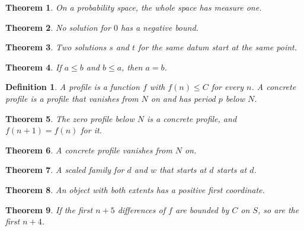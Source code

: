 \documentclass[11pt]{article}
\newtheorem{theorem}{Theorem}
\newtheorem{definition}{Definition}
\newcommand{\lean}[1]{}
\begin{document}
\begin{theorem}\label{thm:probability}\lean{Shape.probability}
On a probability space, the whole space has measure one.
\end{theorem}

\begin{theorem}\label{thm:none-large}\lean{Shape.none_large}
No solution for $0$ has a negative bound.
\end{theorem}

\begin{theorem}\label{thm:two-solutions}\lean{Shape.two_solutions}
Two solutions $s$ and $t$ for the same datum start at the same point.
\end{theorem}

\begin{theorem}\label{thm:both}\lean{Shape.both}
If $a \le b$ and $b \le a$, then $a = b$.
\end{theorem}

\begin{definition}\label{def:profile}\lean{Shape.Profile}\lean{Shape.Concrete}
A profile is a function $f$ with $f(n) \le C$ for every $n$. A concrete profile is a profile that
vanishes from $N$ on and has period $p$ below $N$.
\end{definition}

\begin{theorem}\label{thm:build}\lean{Shape.build}\lean{Shape.build_rec}
The zero profile below $N$ is a concrete profile, and $f(n + 1) = f(n)$ for it.
\end{theorem}

\begin{theorem}\label{thm:vanishes}\lean{Shape.vanishes}
A concrete profile vanishes from $N$ on.
\end{theorem}

\begin{theorem}\label{thm:scaled}\lean{Shape.scaled}
A scaled family for $d$ and $w$ that starts at $d$ starts at $d$.
\end{theorem}

\begin{theorem}\label{thm:both-pos}\lean{Shape.both_pos}
An object with both extents has a positive first coordinate.
\end{theorem}

\begin{theorem}\label{thm:jet}\lean{Shape.jet_lower}
If the first $n + 5$ differences of $f$ are bounded by $C$ on $S$, so are the first $n + 4$.
\end{theorem}
\end{document}
